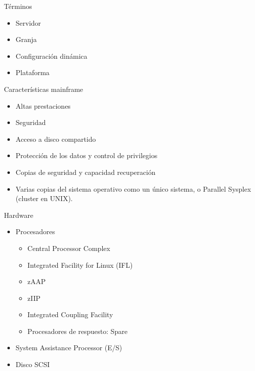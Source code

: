 \documentclass[compress]{beamer}
\begin{document}
\begin{frame}
	\begin{exampleblock}{Términos}
		\begin{itemize}
			\item Servidor
			\item Granja
			\item Configuración dinámica
			\item Plataforma
		\end{itemize}
	\end{exampleblock}
	\begin{block}{Características mainframe}
		\begin{itemize}
			\item Altas prestaciones
			\item Seguridad
			\item Acceso a disco compartido
			\item Protección de los datos y control de privilegios
			\item Copias de seguridad y capacidad recuperación
			\item Varias copias del sistema operativo como un único sistema, o Parallel Sysplex (cluster en UNIX).
		\end{itemize}
	\end{block}
\end{frame}

\begin{frame}
	\begin{block}{Hardware}
		\begin{itemize}
			\item Procesadores
			\begin{itemize}
				\item Central Processor Complex
				\item Integrated Facility for Linux (IFL)
				\item zAAP
				\item zIIP
				\item Integrated Coupling Facility
				\item Procesadores de respuesto: Spare
			\end{itemize}

			\item System Assistance Processor (E/S)
			\item Disco SCSI
			
		\end{itemize}
	\end{block}
\end{frame}
\end{document}
